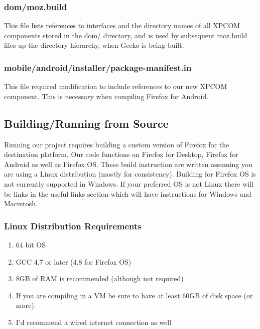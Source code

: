 \documentclass[12pt]{article}
\begin{document}
\subsubsection{dom/moz.build}
This file lists references to interfaces and the directory names of all XPCOM components stored in the dom/ directory, and is used by subsequent moz.build files up the directory hierarchy, when Gecko is being built.

\subsubsection{mobile/android/installer/package-manifest.in}
This file required modification to include references to our new XPCOM component. This is necessary when compiling Firefox for Android.
\pagebreak

\subsection{Building/Running from Source}
Running our project requires building a custom version of Firefox for the destination platform.  Our code 
functions on Firefox for Desktop, Firefox for Android as well as Firefox OS.  These build instruction are
written assuming you are using a Linux distribution (mostly for consistency). Building for Firefox OS is not currently supported in Windows. If your preferred OS is not Linux there will be links in the useful links section which will have instructions for Windows and Macintosh. 
\subsubsection{Linux Distribution Requirements}
	\begin{enumerate}
		\item 64 bit OS
		\item GCC 4.7 or later (4.8 for Firefox OS)
		\item 8GB of RAM is recommended (although not required)
		\item If you are compiling in a VM be sure to have at least 60GB of disk space (or more).
		\item I'd recommend a wired internet connection as well
	\end{enumerate}
\end{document}
